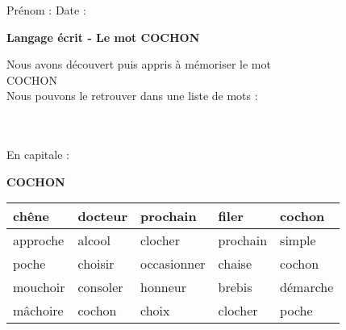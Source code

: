 \documentclass[a4paper, 11pt,oneside, fleqn]{article}
\begin{document}
\newcommand{\x}{\times}
\renewcommand{\arraystretch}{1.5}

\sloppy
\pagestyle{empty}
\begin{onehalfspace}


\sffamily \noindent \Large Pr\'enom : \fbox{\begin{minipage}{9cm} \vspace{1.2cm}\hspace{9cm} \end{minipage}} \hspace{1.5cm}\Large Date :\vspace{2mm}\\
\begin{minipage}{12cm}
\begin{center}
\Large\textbf{Langage \'ecrit - Le mot \MakeUppercase{cochon}}
\end{center}
\normalsize Nous avons d\'ecouvert puis appris \`a m\'emoriser le mot\\
\MakeUppercase{cochon}\\
Nous pouvons le retrouver dans une liste de mots : \end{minipage}\\
\vspace{0.25cm}\\
 
\large\noindent En capitale :
\begin{center}
{\huge \textbf{\MakeUppercase{cochon}}}
\vspace{0.25cm}\\
\begin{tabulary}{17cm}{|g|g|g|g|g|}
\hline
chêne & docteur & prochain & filer & cochon \\
\hline
approche & alcool & clocher & prochain & simple \\
\hline
poche & choisir & occasionner & chaise & cochon \\
\hline
mouchoir & consoler & honneur & brebis & démarche \\
\hline
mâchoire & cochon & choix & clocher & poche \\
\hline
\end{tabulary}
\end{center}
\vspace{0.5cm}


\end{onehalfspace}
\end{document}
